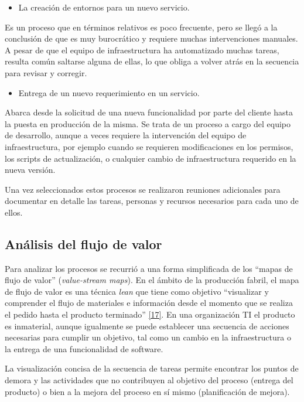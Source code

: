 \begin{itemize}
\item La creación de entornos para un nuevo servicio.
\end{itemize}
Es un proceso que en términos relativos es poco frecuente, pero se llegó a la conclusión de que es muy burocrático y requiere muchas intervenciones manuales. A pesar de que el equipo de infraestructura ha automatizado muchas tareas, resulta común saltarse alguna de ellas, lo que obliga a volver atrás en la secuencia para revisar y corregir.

\begin{itemize}
\item Entrega de un nuevo requerimiento en un servicio.
\end{itemize}
Abarca desde la solicitud de una nueva funcionalidad por parte del cliente hasta la puesta en producción de la misma. Se trata de un proceso a cargo del equipo de desarrollo, aunque a veces requiere la intervención del equipo de infraestructura, por ejemplo cuando se requieren modificaciones en los permisos, los scripts de actualización, o cualquier cambio de infraestructura requerido en la nueva versión. 

Una vez seleccionados estos procesos se realizaron reuniones adicionales para documentar en detalle las tareas, personas y recursos necesarios para cada uno de ellos.

\subsection{Análisis del flujo de valor}

Para analizar los procesos se recurrió a una forma simplificada de los “mapas de flujo de valor” (\textit{value-stream maps}). En el ámbito de la producción fabril, el mapa de flujo de valor es una técnica \textit{lean} que tiene como objetivo “visualizar y comprender el flujo de materiales e información desde el momento que se realiza el pedido hasta el producto terminado” \href{https://www.zotero.org/google-docs/?bOLGEz}{[17]}. En una organización TI el producto es inmaterial, aunque igualmente se puede establecer una secuencia de acciones necesarias para cumplir un objetivo, tal como un cambio en la infraestructura o la entrega de una funcionalidad de software.

La visualización concisa de la secuencia de tareas permite encontrar los puntos de demora y las actividades que no contribuyen al objetivo del proceso (entrega del producto) o bien a la mejora del proceso en sí mismo (planificación de mejora).

